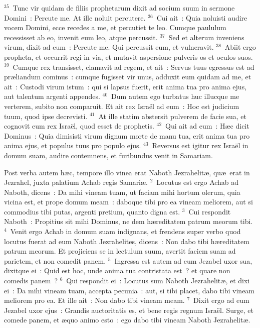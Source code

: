 ${}^{35}$~Tunc vir quidam de filiis prophetarum dixit ad socium suum in sermone Domini~: Percute me. At ille noluit percutere.
${}^{36}$~Cui ait~: Quia noluisti audire vocem Domini, ecce recedes a me, et percutiet te leo. Cumque paululum recessisset ab eo, invenit eum leo, atque percussit.
${}^{37}$~Sed et alterum inveniens virum, dixit ad eum~: Percute me. Qui percussit eum, et vulneravit.
${}^{38}$~Abiit ergo propheta, et occurrit regi in via, et mutavit aspersione pulveris os et oculos suos.
${}^{39}$~Cumque rex transisset, clamavit ad regem, et ait~: Servus tuus egressus est ad pr\ae liandum cominus~: cumque fugisset vir unus, adduxit eum quidam ad me, et ait~: Custodi virum istum~: qui si lapsus fuerit, erit anima tua pro anima ejus, aut talentum argenti appendes.
${}^{40}$~Dum autem ego turbatus huc illucque me verterem, subito non comparuit. Et ait rex Isra\"el ad eum~: Hoc est judicium tuum, quod ipse decrevisti.
${}^{41}$~At ille statim abstersit pulverem de facie sua, et cognovit eum rex Isra\"el, quod esset de prophetis.
${}^{42}$~Qui ait ad eum~: H\ae c dicit Dominus~: Quia dimisisti virum dignum morte de manu tua, erit anima tua pro anima ejus, et populus tuus pro populo ejus.
${}^{43}$~Reversus est igitur rex Isra\"el in domum suam, audire contemnens, et furibundus venit in Samariam.

\lettrine[lines=10,image=true,loversize=0.05,lraise=-0.03]{P}{}ost verba autem h\ae c, tempore illo vinea erat Naboth Jezrahelit\ae , qu\ae\ erat in Jezrahel, juxta palatium Achab regis Samari\ae .
${}^{2}$~Locutus est ergo Achab ad Naboth, dicens~: Da mihi vineam tuam, ut faciam mihi hortum olerum, quia vicina est, et prope domum meam~: daboque tibi pro ea vineam meliorem, aut si commodius tibi putas, argenti pretium, quanto digna est.
${}^{3}$~Cui respondit Naboth~: Propitius sit mihi Dominus, ne dem h\ae reditatem patrum meorum tibi.
${}^{4}$~Venit ergo Achab in domum suam indignans, et frendens super verbo quod locutus fuerat ad eum Naboth Jezrahelites, dicens~: Non dabo tibi h\ae reditatem patrum meorum. Et projiciens se in lectulum suum, avertit faciem suam ad parietem, et non comedit panem.
${}^{5}$~Ingressa est autem ad eum Jezabel uxor sua, dixitque ei~: Quid est hoc, unde anima tua contristata est~? et quare non comedis panem~?
${}^{6}$~Qui respondit ei~: Locutus sum Naboth Jezrahelit\ae , et dixi ei~: Da mihi vineam tuam, accepta pecunia~: aut, si tibi placet, dabo tibi vineam meliorem pro ea. Et ille ait~: Non dabo tibi vineam meam.
${}^{7}$~Dixit ergo ad eum Jezabel uxor ejus~: Grandis auctoritatis es, et bene regis regnum Isra\"el. Surge, et comede panem, et \ae quo animo esto~: ego dabo tibi vineam Naboth Jezrahelit\ae .



